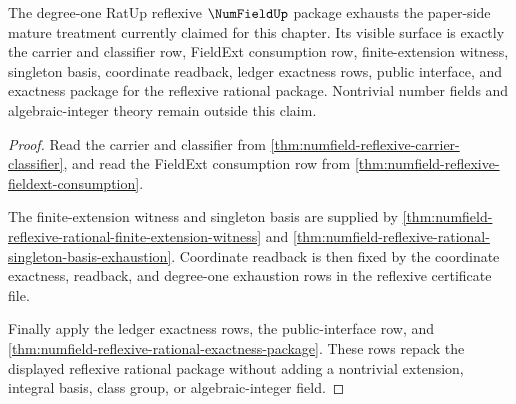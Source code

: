 \begin{theorem}
\label{thm:numfield-mature-reflexive-coverage}
The degree-one RatUp reflexive $\NumFieldUp$ package exhausts the paper-side
mature treatment currently claimed for this chapter. Its visible surface is
exactly the carrier and classifier row, FieldExt consumption row,
finite-extension witness, singleton basis, coordinate readback, ledger
exactness rows, public interface, and exactness package for the reflexive
rational package. Nontrivial number fields and algebraic-integer theory remain
outside this claim.
\end{theorem}
\begin{proof}
Read the carrier and classifier from
\autoref{thm:numfield-reflexive-carrier-classifier}, and read the FieldExt
consumption row from \autoref{thm:numfield-reflexive-fieldext-consumption}.

The finite-extension witness and singleton basis are supplied by
\autoref{thm:numfield-reflexive-rational-finite-extension-witness} and
\autoref{thm:numfield-reflexive-rational-singleton-basis-exhaustion}.
Coordinate readback is then fixed by the coordinate exactness, readback, and
degree-one exhaustion rows in the reflexive certificate file.

Finally apply the ledger exactness rows, the public-interface row, and
\autoref{thm:numfield-reflexive-rational-exactness-package}. These rows repack
the displayed reflexive rational package without adding a nontrivial extension,
integral basis, class group, or algebraic-integer field.
\end{proof}
